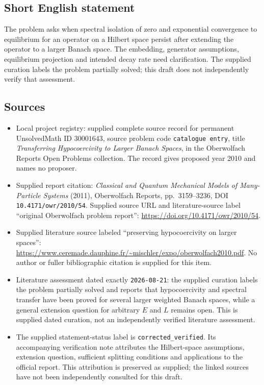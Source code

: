 \documentclass[11pt]{article}
\begin{document}
\subsection{Short English statement}
The problem asks when spectral isolation of zero and exponential convergence to equilibrium for an operator on a Hilbert space persist after extending the operator to a larger Banach space. The embedding, generator assumptions, equilibrium projection and intended decay rate need clarification. The supplied curation labels the problem partially solved; this draft does not independently verify that assessment.
\subsection{Sources}
\begin{itemize}
\item Local project registry: supplied complete source record for permanent UnsolvedMath ID \(30001643\), source problem code \texttt{catalogue entry}, title \emph{Transferring Hypocoercivity to Larger Banach Spaces}, in the Oberwolfach Reports Open Problems collection. The record gives proposed year 2010 and names no proposer.
\item Supplied report citation: \emph{Classical and Quantum Mechanical Models of Many-Particle Systems} (2011), Oberwolfach Reports, pp.\ 3159--3236, DOI \texttt{10.4171/owr/2010/54}. Supplied source URL and literature-source label ``original Oberwolfach problem report'': \url{https://doi.org/10.4171/owr/2010/54}.
\item Supplied literature source labeled ``preserving hypocoercivity on larger spaces'': \url{https://www.ceremade.dauphine.fr/~mischler/expo/oberwolfach2010.pdf}. No author or fuller bibliographic citation is supplied for this item.
\item Literature assessment dated exactly \texttt{2026-08-21}: the supplied curation labels the problem partially solved and reports that hypocoercivity and spectral transfer have been proved for several larger weighted Banach spaces, while a general extension question for arbitrary \(E\) and \(L\) remains open. This is supplied dated curation, not an independently verified literature assessment.
\item The supplied statement-status label is \texttt{corrected\_verified}. Its accompanying verification note attributes the Hilbert-space assumptions, extension question, sufficient splitting conditions and applications to the official report. This attribution is preserved as supplied; the linked sources have not been independently consulted for this draft.
\end{itemize}
\end{document}
